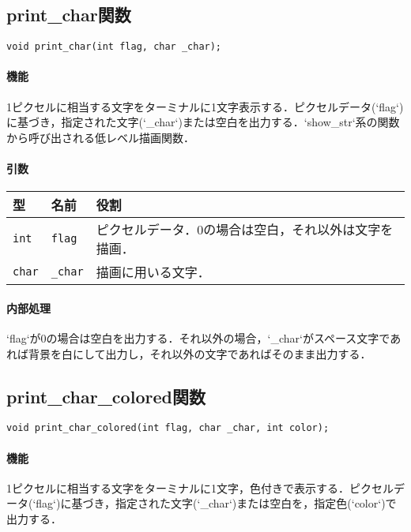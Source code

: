 \documentclass[uplatex]{jsarticle}
\begin{document}
\subsection{print\_char関数}
\texttt{void print\_char(int flag, char \_char);}
\paragraph{機能}
1ピクセルに相当する文字をターミナルに1文字表示する．ピクセルデータ(`flag`)に基づき，指定された文字(`\_char`)または空白を出力する．`show\_str`系の関数から呼び出される低レベル描画関数．

\paragraph{引数}
\begin{center}
    \begin{tabular}{|l|l|p{7cm}|}
        \hline
        \textbf{型} & \textbf{名前} & \textbf{役割} \\ \hline
        \texttt{int} & \texttt{flag} & ピクセルデータ．0の場合は空白，それ以外は文字を描画． \\ \hline
        \texttt{char} & \texttt{\_char} & 描画に用いる文字． \\ \hline
    \end{tabular}
\end{center}

\paragraph{内部処理}
`flag`が0の場合は空白を出力する．それ以外の場合，`\_char`がスペース文字であれば背景を白にして出力し，それ以外の文字であればそのまま出力する．

\subsection{print\_char\_colored関数}
\texttt{void print\_char\_colored(int flag, char \_char, int color);}
\paragraph{機能}
1ピクセルに相当する文字をターミナルに1文字，色付きで表示する．ピクセルデータ(`flag`)に基づき，指定された文字(`\_char`)または空白を，指定色(`color`)で出力する．
\end{document}
